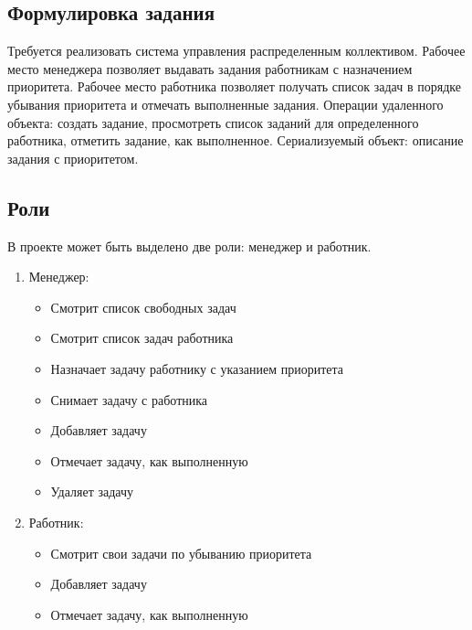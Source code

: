 \subsection{Формулировка задания}
Требуется реализовать система управления распределенным коллективом. Рабочее место менеджера позволяет выдавать задания работникам с назначением приоритета. Рабочее место работника позволяет получать список задач в порядке убывания приоритета и отмечать выполненные задания. Операции удаленного объекта: создать задание, просмотреть список заданий для определенного работника, отметить задание, как выполненное. Сериализуемый объект: описание задания с приоритетом.

\subsection{Роли}
В проекте может быть выделено две роли: менеджер и работник. 
\begin{enumerate}
	\item Менеджер:
	\begin{itemize}
		\item Смотрит список свободных задач
		\item Смотрит список задач работника
		\item Назначает задачу работнику с указанием приоритета
		\item Снимает задачу с работника
		\item Добавляет задачу
		\item Отмечает задачу, как выполненную
		\item Удаляет задачу
	\end{itemize}
	\item Работник:
	\begin{itemize}
		\item Смотрит свои задачи по убыванию приоритета
		\item Добавляет задачу
		\item Отмечает задачу, как выполненную
	\end{itemize}
\end{enumerate}